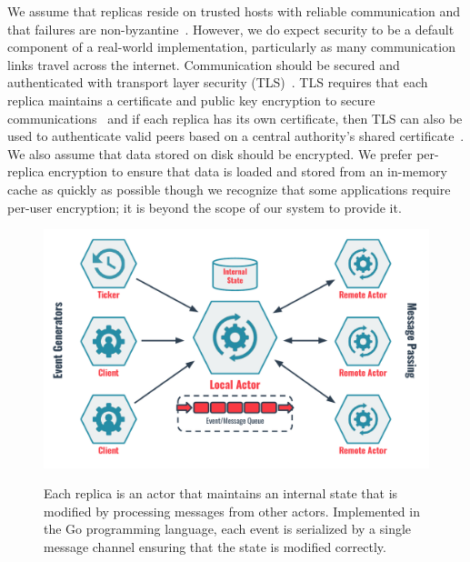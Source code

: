 We assume that replicas reside on trusted hosts with reliable communication and that failures are non-byzantine~\cite{byzantine-generals,byzantine_fault_tolerance}.
However, we do expect security to be a default component of a real-world implementation, particularly as many communication links travel across the internet.
Communication should be secured and authenticated with transport layer security (TLS)~\cite{tlsv1,tlsv2}.
TLS requires that each replica maintains a certificate and public key encryption to secure communications~\cite{rsa} and if each replica has its own certificate, then TLS can also be used to authenticate valid peers based on a central authority's shared certificate~\cite{tls_authentication}.
We also assume that data stored on disk should be encrypted.
We prefer per-replica encryption to ensure that data is loaded and stored from an in-memory cache as quickly as possible though we recognize that some applications require per-user encryption; it is beyond the scope of our system to provide it.

\begin{figure}
    \begin{center}
        \includegraphics[width=5in]{figures/ch05_actor_model.pdf}
    \end{center}
    \renewcommand{\baselinestretch}{1}
    \small\normalsize

    \begin{quote}
        \caption[Replica Actor Model]{Each replica is an actor that maintains an internal state that is modified by processing messages from other actors. Implemented in the Go programming language, each event is serialized by a single message channel ensuring that the state is modified correctly.}
        \label{fig:ch05_actor_model}
    \end{quote}
\end{figure}
\renewcommand{\baselinestretch}{2}
\small\normalsize

